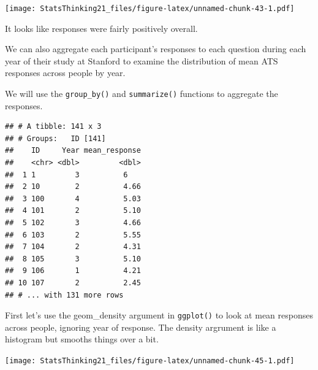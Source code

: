 \documentclass[12pt,]{book}
\newenvironment{Shaded}{\begin{snugshade}}{\end{snugshade}}
\newcommand{\DataTypeTok}[1]{\textcolor[rgb]{0.13,0.29,0.53}{#1}}
\newcommand{\KeywordTok}[1]{\textcolor[rgb]{0.13,0.29,0.53}{\textbf{#1}}}
\newcommand{\NormalTok}[1]{#1}
\newcommand{\OperatorTok}[1]{\textcolor[rgb]{0.81,0.36,0.00}{\textbf{#1}}}
\newcommand{\StringTok}[1]{\textcolor[rgb]{0.31,0.60,0.02}{#1}}
\begin{document}
\texttt{[image: StatsThinking21\_files/figure-latex/unnamed-chunk-43-1.pdf]}

It looks like responses were fairly positively overall.

We can also aggregate each participant's responses to each question during each year of their study at Stanford to examine the distribution of mean ATS responses across people by year.

We will use the \texttt{group\_by()} and \texttt{summarize()} functions to aggregate the responses.

\begin{Shaded}
\end{Shaded}

\begin{verbatim}
## # A tibble: 141 x 3
## # Groups:   ID [141]
##    ID     Year mean_response
##    <chr> <dbl>         <dbl>
##  1 1         3          6   
##  2 10        2          4.66
##  3 100       4          5.03
##  4 101       2          5.10
##  5 102       3          4.66
##  6 103       2          5.55
##  7 104       2          4.31
##  8 105       3          5.10
##  9 106       1          4.21
## 10 107       2          2.45
## # ... with 131 more rows
\end{verbatim}

First let's use the geom\_density argument in \texttt{ggplot()} to look at mean responses across people, ignoring year of response. The density argrument is like a histogram but smooths things over a bit.

\begin{Shaded}
\end{Shaded}

\texttt{[image: StatsThinking21\_files/figure-latex/unnamed-chunk-45-1.pdf]}
\end{document}

